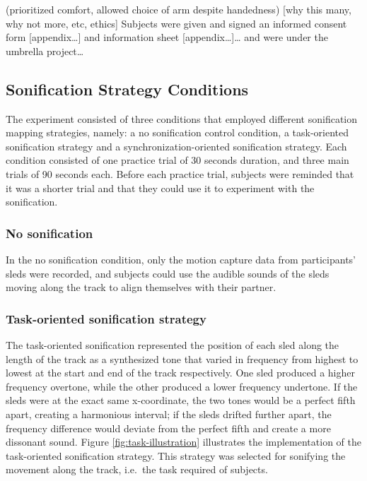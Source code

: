 \documentclass[10pt,a4paper,onecolumn]{article}
\begin{document}
(prioritized comfort, allowed choice of arm despite handedness) {[}why this many, why not more, etc, ethics{]} Subjects were given and signed an informed consent form {[}appendix\ldots{]} and information sheet {[}appendix\ldots{]}\ldots{} and were under the umbrella project\ldots{}

\hypertarget{sonification-strategy-conditions}{%
\subsection{Sonification Strategy Conditions}\label{sonification-strategy-conditions}}

The experiment consisted of three conditions that employed different sonification mapping strategies, namely: a no sonification control condition, a task-oriented sonification strategy and a synchronization-oriented sonification strategy. Each condition consisted of one practice trial of 30 seconds duration, and three main trials of 90 seconds each. Before each practice trial, subjects were reminded that it was a shorter trial and that they could use it to experiment with the sonification.

\hypertarget{no-sonification}{%
\subsubsection{No sonification}\label{no-sonification}}

In the no sonification condition, only the motion capture data from participants' sleds were recorded, and subjects could use the audible sounds of the sleds moving along the track to align themselves with their partner.

\hypertarget{task-oriented-sonification-strategy}{%
\subsubsection{Task-oriented sonification strategy}\label{task-oriented-sonification-strategy}}

The task-oriented sonification represented the position of each sled along the length of the track as a synthesized tone that varied in frequency from highest to lowest at the start and end of the track respectively. One sled produced a higher frequency overtone, while the other produced a lower frequency undertone. If the sleds were at the exact same x-coordinate, the two tones would be a perfect fifth apart, creating a harmonious interval; if the sleds drifted further apart, the frequency difference would deviate from the perfect fifth and create a more dissonant sound. Figure \ref{fig:task-illustration} illustrates the implementation of the task-oriented sonification strategy. This strategy was selected for sonifying the movement along the track, i.e.~the task required of subjects.
\end{document}
